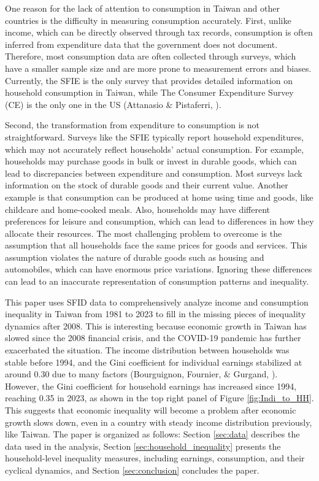 \documentclass{article}
\begin{document}
One reason for the lack of attention to consumption in Taiwan and other countries is the difficulty in measuring consumption accurately.
First, unlike income, which can be directly observed through tax records, consumption is often inferred from expenditure data that the government does not document.
Therefore, most consumption data are often collected through surveys, which have a smaller sample size and are more prone to measurement errors and biases.
Currently, the SFIE is the only survey that provides detailed information on household consumption in Taiwan, while The Consumer Expenditure Survey (CE) is the only one in the US (Attanasio \& Pistaferri, \citeyear{JEP_Consumption_Inequality}).

Second, the transformation from expenditure to consumption is not straightforward. Surveys like the SFIE typically report household expenditures, which may not accurately reflect households' actual consumption.
For example, households may purchase goods in bulk or invest in durable goods, which can lead to discrepancies between expenditure and consumption. Most surveys lack information on the stock of durable goods and their current value.
Another example is that consumption can be produced at home using time and goods, like childcare and home-cooked meals. Also, households may have different preferences for leisure and consumption, which can lead to differences in how they allocate their resources.
The most challenging problem to overcome is the assumption that all households face the same prices for goods and services. This assumption violates the nature of durable goods such as housing and automobiles, which can have enormous price variations. Ignoring these differences can lead to an inaccurate representation of consumption patterns and inequality.

This paper uses SFID data to comprehensively analyze income and consumption inequality in Taiwan from 1981 to 2023 to fill in the missing pieces of inequality dynamics after 2008. This is interesting because economic growth in Taiwan has slowed since the 2008 financial crisis, and the COVID-19 pandemic has further exacerbated the situation.
The income distribution between households was stable before 1994, and the Gini coefficient for individual earnings stabilized at around 0.30 due to many factors (Bourguignon, Fournier, \& Gurgand, \citeyear{TW_stable_dist}).
However, the Gini coefficient for household earnings has increased since 1994, reaching 0.35 in 2023, as shown in the top right panel of Figure \ref{fig:Indi_to_HH}.
This suggests that economic inequality will become a problem after economic growth slows down, even in a country with steady income distribution previously, like Taiwan.
The paper is organized as follows: Section \ref{sec:data} describes the data used in the analysis, Section \ref{sec:household_inequality} presents the household-level inequality measures, including earnings, consumption, and their cyclical dynamics, and Section \ref{sec:conclusion} concludes the paper.
\end{document}
